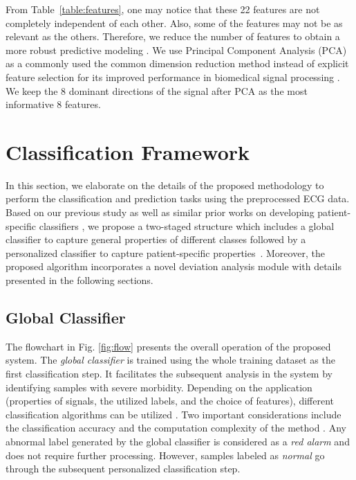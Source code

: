 From Table~\ref{table:features}, one may notice that these 22 features are not completely independent of each other. Also, some of the features may not be as relevant as the others. Therefore, we reduce the number of features to obtain a more robust predictive modeling \cite{autofs, llamedo2012automatic}. We use Principal Component Analysis (PCA) %
as a commonly used the common dimension reduction method instead of explicit feature selection for its improved performance in biomedical signal processing \cite{castells2007principal,martis2013ecg}. We keep the 8 dominant directions of the signal after PCA as the most informative 8 features.



\section{Classification Framework}


In this section, we elaborate on the details of the proposed methodology to perform the classification and prediction tasks using the preprocessed ECG data. Based on our previous study \cite{chen2018predictive} as well as similar prior works on developing patient-specific classifiers \cite{Hu_et_al,deChazal2006,llamedo2012automatic}, we propose a two-staged structure which includes a global classifier to capture general properties of different classes followed by a personalized classifier to capture patient-specific properties~\cite{chen2018predictive,Hu_et_al,deChazal2006,llamedo2012automatic}. Moreover, the proposed algorithm incorporates a novel deviation analysis module with details presented in the following sections. 

\subsection{Global Classifier}

The flowchart in Fig. \ref{fig:flow} presents the overall operation of the proposed system. The \textit{global classifier} is trained using the whole training dataset as the first classification step. It facilitates the subsequent analysis in the system by identifying samples with severe morbidity. Depending on the application (properties of signals, the utilized labels, and the choice of features), different classification algorithms can be utilized \cite{Hu_et_al,llamedo2012automatic}. Two important considerations include the classification accuracy and the computation complexity of the method \cite{llamedo2012automatic}. Any abnormal label generated by the global classifier is considered as a \textit{red alarm} and does not require further processing. However, samples labeled as \textit{normal} go through the subsequent personalized classification step. 

